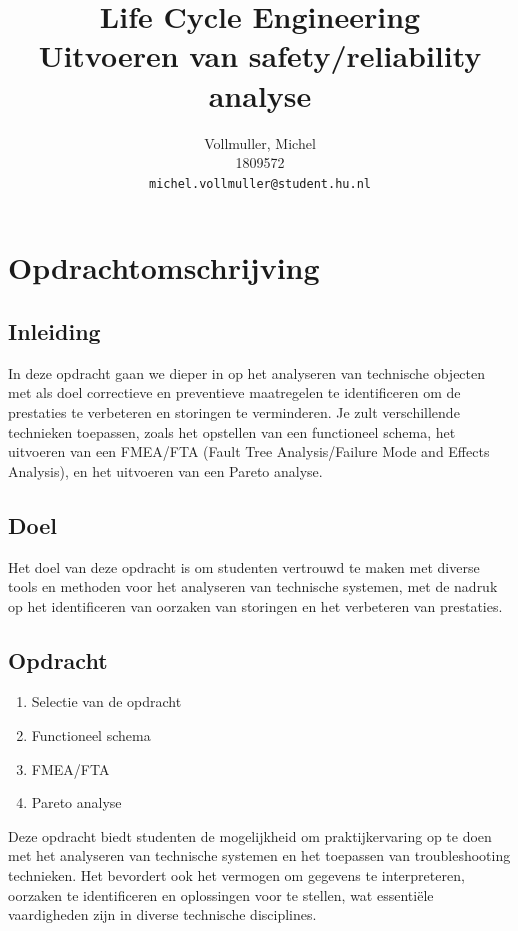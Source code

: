 \documentclass{article}
\title{
    Life Cycle Engineering \\
    \large Uitvoeren van safety/reliability analyse}
\author{
  Vollmuller, Michel\\
  1809572\\
  \texttt{michel.vollmuller@student.hu.nl}
}
\begin{document}
\maketitle


\tableofcontents

\setlength{\parindent}{0pt} %

\newpage
\section{Opdrachtomschrijving}
\subsection{Inleiding}
In deze opdracht gaan we dieper in op het analyseren van technische objecten met als doel correctieve en preventieve maatregelen te identificeren om de prestaties te verbeteren en storingen te verminderen. Je zult verschillende technieken toepassen, zoals het opstellen van een functioneel schema, het uitvoeren van een FMEA/FTA (Fault Tree Analysis/Failure Mode and Effects Analysis), en het uitvoeren van een Pareto analyse.

\subsection{Doel}
Het doel van deze opdracht is om studenten vertrouwd te maken met diverse tools en methoden voor het analyseren van technische systemen, met de nadruk op het identificeren van oorzaken van storingen en het verbeteren van prestaties.

\subsection{Opdracht}
\begin{enumerate}
  \item Selectie van de opdracht
  \item Functioneel schema
  \item FMEA/FTA
  \item Pareto analyse
\end{enumerate}

Deze opdracht biedt studenten de mogelijkheid om praktijkervaring op te doen met het analyseren van technische systemen en het toepassen van troubleshooting technieken. Het bevordert ook het vermogen om gegevens te interpreteren, oorzaken te identificeren en oplossingen voor te stellen, wat essentiële vaardigheden zijn in diverse technische disciplines.
\end{document}
